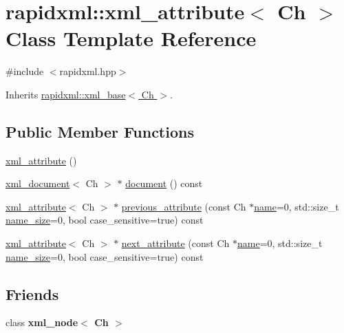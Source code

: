 \hypertarget{classrapidxml_1_1xml__attribute}{\section{rapidxml\-:\-:xml\-\_\-attribute$<$ Ch $>$ Class Template Reference}
\label{classrapidxml_1_1xml__attribute}
}


{\ttfamily \#include $<$rapidxml.\-hpp$>$}



Inherits \hyperlink{classrapidxml_1_1xml__base}{rapidxml\-::xml\-\_\-base$<$ Ch $>$}.

\subsection*{Public Member Functions}
\begin{DoxyCompactItemize}
\item 
\hyperlink{classrapidxml_1_1xml__attribute_a26be291103917d3e8de110d46dd83816}{xml\-\_\-attribute} ()
\item 
\hyperlink{classrapidxml_1_1xml__document}{xml\-\_\-document}$<$ Ch $>$ $\ast$ \hyperlink{classrapidxml_1_1xml__attribute_a8b6d31d899e27f01bde35b53d98496ec}{document} () const 
\item 
\hyperlink{classrapidxml_1_1xml__attribute}{xml\-\_\-attribute}$<$ Ch $>$ $\ast$ \hyperlink{classrapidxml_1_1xml__attribute_ae3547cc30b201fd6d7b98c04dda26f89}{previous\-\_\-attribute} (const Ch $\ast$\hyperlink{classrapidxml_1_1xml__base_a9a09739310469995db078ebd0da3ed45}{name}=0, std\-::size\-\_\-t \hyperlink{classrapidxml_1_1xml__base_a7e7f98b3d01e1eab8dc1ca69aad9af84}{name\-\_\-size}=0, bool case\-\_\-sensitive=true) const 
\item 
\hyperlink{classrapidxml_1_1xml__attribute}{xml\-\_\-attribute}$<$ Ch $>$ $\ast$ \hyperlink{classrapidxml_1_1xml__attribute_a56c08d7c96203286c889a43849328a86}{next\-\_\-attribute} (const Ch $\ast$\hyperlink{classrapidxml_1_1xml__base_a9a09739310469995db078ebd0da3ed45}{name}=0, std\-::size\-\_\-t \hyperlink{classrapidxml_1_1xml__base_a7e7f98b3d01e1eab8dc1ca69aad9af84}{name\-\_\-size}=0, bool case\-\_\-sensitive=true) const 
\end{DoxyCompactItemize}
\subsection*{Friends}
\begin{DoxyCompactItemize}
\item 
\hypertarget{classrapidxml_1_1xml__attribute_aa7e464ce3fe512598ff8dda47291941f}{class {\bfseries xml\-\_\-node$<$ Ch $>$}}\label{classrapidxml_1_1xml__attribute_aa7e464ce3fe512598ff8dda47291941f}

\end{DoxyCompactItemize}
